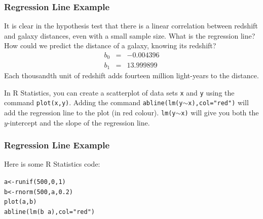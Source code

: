 \documentclass[xcolor=dvipsnames]{beamer}
\begin{document}
\begin{frame}
  \frametitle{Regression Line Example}
   It is clear in the hypothesis test
  that there is a linear correlation between redshift and galaxy
  distances, even with a small sample size. What is the regression
  line? How could we predict the distance of a galaxy, knowing its
  redshift?
  \begin{equation}
    \label{eq:ahnuwiez}
    \begin{array}{rcl}
      b_{0}&=&-0.004396 \\
      b_{1}&=&13.999899
    \end{array}
  \end{equation}
  Each thousandth unit of redshift adds fourteen million light-years to
  the distance.

  \bigskip

  In R Statistics, you can create a scatterplot of data sets
  \texttt{x} and \texttt{y} using the command \texttt{plot(x,y)}.
  Adding the command \texttt{abline(lm(y}$\sim$\texttt{x),col="red")} will add
  the regression line to the plot (in red colour).
  \texttt{lm(y}$\sim$\texttt{x)} will give you both the $y$-intercept and the
  slope of the regression line.
\end{frame}

\begin{frame}[fragile]
  \frametitle{Regression Line Example}
  Here is some R Statistics code:
\begin{alltt}
a<-runif(500,0,1) \newline
b<-rnorm(500,a,0.2) \newline
plot(a,b) \newline
abline(lm(b~a),col="red")
\end{alltt}
\end{frame}
\end{document}
